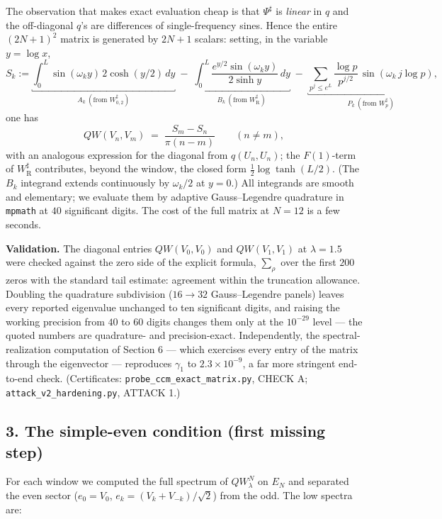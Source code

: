 \documentclass[
  letterpaper,
  11pt]{article}
\renewcommand{\underbrace}[1]{\underbracket{#1}}%
\theoremstyle{plain}
\theoremstyle{definition}
\theoremstyle{remark}
\providecommand{\R}{\mathrm{R}}
\begin{document}
The observation that makes exact evaluation cheap is that \(\Psi^\sharp\) is \emph{linear} in \(q\) and the off-diagonal \(q\)'s are differences of single-frequency sines. Hence the entire \((2N+1)^2\) matrix is generated by \(2N+1\) scalars: setting, in the variable \(y = \log x\),
\[
S_k := \underbrace{\int_0^L \sin(\omega_k y)\,2\cosh(y/2)\,dy}_{A_k\ (\text{from }W_{0,2}^\sharp)}
\;-\;\underbrace{\int_0^L \frac{e^{y/2}\sin(\omega_k y)}{2\sinh y}\,dy}_{B_k\ (\text{from }W_\R^\sharp)}
\;-\;\underbrace{\sum_{p^j\le e^L}\frac{\log p}{p^{j/2}}\,\sin(\omega_k\, j\log p)}_{P_k\ (\text{from }W_p^\sharp)},
\]
one has
\[
QW(V_n,V_m) \;=\; \frac{S_m - S_n}{\pi(n-m)} \qquad (n\neq m),
\]
with an analogous expression for the diagonal from \(q(U_n,U_n)\); the \(F(1)\)-term of \(W_\R^\sharp\) contributes, beyond the window, the closed form \(\tfrac12\log\tanh(L/2)\). (The \(B_k\) integrand extends continuously by \(\omega_k/2\) at \(y=0\).) All integrands are smooth and elementary; we evaluate them by adaptive Gauss--Legendre quadrature in \texttt{mpmath} at \(40\) significant digits. The cost of the full matrix at \(N = 12\) is a few seconds.

\textbf{Validation.} The diagonal entries \(QW(V_0,V_0)\) and \(QW(V_1,V_1)\) at \(\lambda = 1.5\) were checked against the zero side of the explicit formula, \(\sum_\rho\) over the first \(200\) zeros with the standard tail estimate: agreement within the truncation allowance. Doubling the quadrature subdivision (\(16 \to 32\) Gauss--Legendre panels) leaves every reported eigenvalue unchanged to ten significant digits, and raising the working precision from \(40\) to \(60\) digits changes them only at the \(10^{-29}\) level --- the quoted numbers are quadrature- and precision-exact. Independently, the spectral-realization computation of Section 6 --- which exercises every entry of the matrix through the eigenvector --- reproduces \(\gamma_1\) to \(2.3\times10^{-9}\), a far more stringent end-to-end check. (Certificates: \texttt{probe\_ccm\_exact\_matrix.py}, CHECK A; \texttt{attack\_v2\_hardening.py}, ATTACK 1.)

\subsection{3. The simple-even condition (first missing step)}\label{the-simple-even-condition-first-missing-step}

For each window we computed the full spectrum of \(QW^N_\lambda\) on \(E_N\) and separated the even sector (\(e_0 = V_0\), \(e_k = (V_k + V_{-k})/\sqrt2\)) from the odd. The low spectra are:
\end{document}
